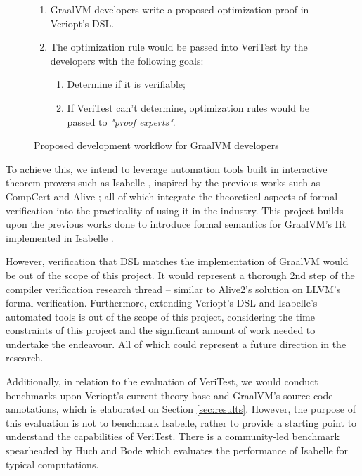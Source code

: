 \begin{figure}[h]
    \begin{enumerate}
        \item GraalVM developers write a proposed optimization proof in Veriopt's DSL.
        \item The optimization rule would be passed into VeriTest by the developers with the following goals:

              \begin{enumerate}
                \item Determine if it is verifiable;
                \item If VeriTest can't determine, optimization rules would be passed to \emph{"proof experts"}.
              \end{enumerate}
    \end{enumerate}
    \caption{Proposed development workflow for GraalVM developers}
    \label{fig:toolGoals}
\end{figure}

To achieve this, we intend to leverage automation tools built in interactive theorem provers such as Isabelle \cite{IsabelleHOL}, inspired by the 
previous works such as CompCert \cite{compcertVerification} and Alive \cite{AliveInLean,Alive2}; all of which integrate the theoretical aspects of 
formal verification into the practicality of using it in the industry. This project builds upon the previous works done to introduce formal semantics 
for GraalVM's \cite{graal} IR \cite{ATVA21_GraalVM_IR_Semantics, Term_Graph_Optimizations} implemented in Isabelle \cite{IsabelleHOL}.

However, verification that DSL matches the implementation of GraalVM would be out of the scope of this project. It would represent a thorough 
2nd step of the compiler verification research thread \cite[p. 5]{CompilerOptimization} -- similar to Alive2's \cite{Alive2} solution on 
LLVM's formal verification. Furthermore, extending Veriopt's DSL and Isabelle's 
automated tools is out of the scope of this project, considering the time constraints of this project and the significant amount of work needed to 
undertake the endeavour. All of which could represent a future direction in the research.

Additionally, in relation to the evaluation of VeriTest, we would conduct benchmarks upon Veriopt's current theory base and GraalVM's source 
code annotations, which is elaborated on Section \ref{sec:results}. However, the purpose of this evaluation is not to benchmark Isabelle, 
rather to provide a starting point to understand the capabilities of VeriTest. There is a community-led benchmark spearheaded by Huch and Bode 
\cite{huch_isabelle_2022} which evaluates the performance of Isabelle for typical computations.

